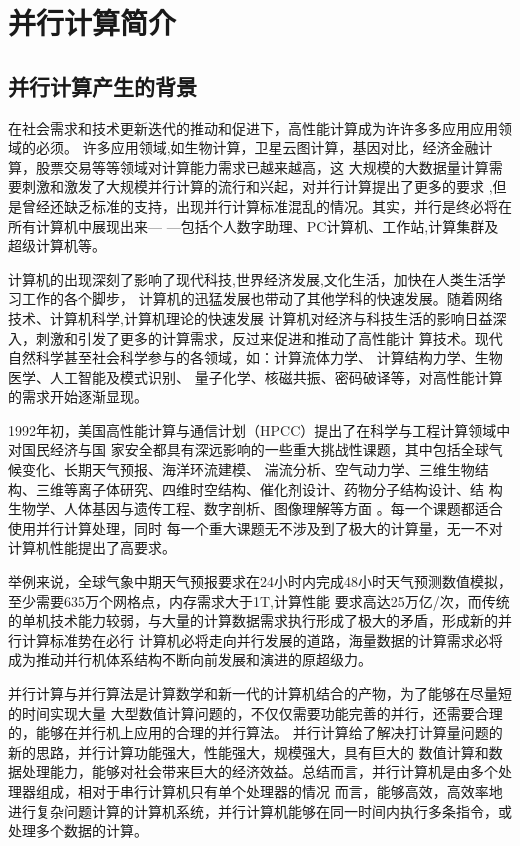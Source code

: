 
\chapter[并行计算简介]{并行计算简介}
\section{并行计算产生的背景}

在社会需求和技术更新迭代的推动和促进下，高性能计算成为许许多多应用应用领域的必须。
许多应用领域,如生物计算，卫星云图计算，基因对比，经济金融计算，股票交易等等领域对计算能力需求已越来越高，这
大规模的大数据量计算需要刺激和激发了大规模并行计算的流行和兴起，对并行计算提出了更多的要求
,但是曾经还缺乏标准的支持，出现并行计算标准混乱的情况。其实，并行是终必将在所有计算机中展现出来—
—包括个人数字助理、PC计算机、工作站,计算集群及超级计算机等。

计算机的出现深刻了影响了现代科技,世界经济发展,文化生活，加快在人类生活学习工作的各个脚步，
计算机的迅猛发展也带动了其他学科的快速发展。随着网络技术、计算机科学,计算机理论的快速发展
计算机对经济与科技生活的影响日益深入，刺激和引发了更多的计算需求，反过来促进和推动了高性能计
算技术。现代自然科学甚至社会科学参与的各领域，如：计算流体力学、 计算结构力学、生物医学、人工智能及模式识别、
量子化学、核磁共振、密码破译等，对高性能计算的需求开始逐渐显现。

1992年初，美国高性能计算与通信计划（HPCC）提出了在科学与工程计算领域中对国民经济与国
家安全都具有深远影响的一些重大挑战性课题，其中包括全球气候变化、长期天气预报、海洋环流建模、
湍流分析、空气动力学、三维生物结构、三维等离子体研究、四维时空结构、催化剂设计、药物分子结构设计、结
构生物学、人体基因与遗传工程、数字剖析、图像理解等方面 \cite{Daibo} 。每一个课题都适合使用并行计算处理，同时
每一个重大课题无不涉及到了极大的计算量，无一不对计算机性能提出了高要求。

举例来说，全球气象中期天气预报要求在24小时内完成48小时天气预测数值模拟，至少需要635万个网格点，内存需求大于1T,计算性能
要求高达25万亿/次，而传统的单机技术能力较弱，与大量的计算数据需求执行形成了极大的矛盾，形成新的并行计算标准势在必行
计算机必将走向并行发展的道路，海量数据的计算需求必将成为推动并行机体系结构不断向前发展和演进的原超级力。

并行计算与并行算法是计算数学和新一代的计算机结合的产物，为了能够在尽量短的时间实现大量
大型数值计算问题的，不仅仅需要功能完善的并行，还需要合理的，能够在并行机上应用的合理的并行算法。 
并行计算给了解决打计算量问题的新的思路，并行计算功能强大，性能强大，规模强大，具有巨大的
数值计算和数据处理能力，能够对社会带来巨大的经济效益。总结而言，并行计算机是由多个处理器组成，相对于串行计算机只有单个处理器的情况
而言，能够高效，高效率地进行复杂问题计算的计算机系统，并行计算机能够在同一时间内执行多条指令，或处理多个数据的计算。  

